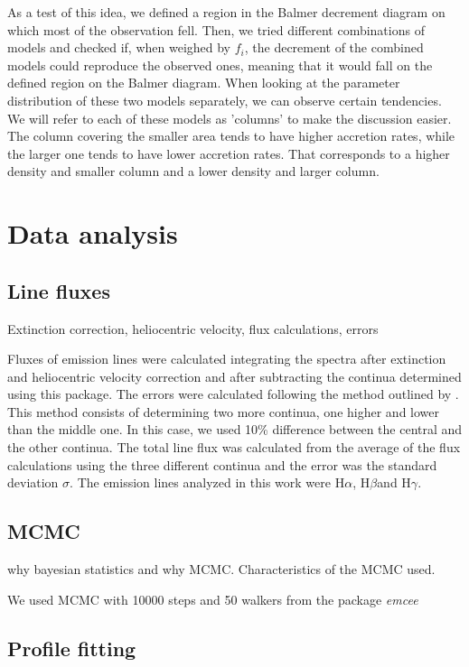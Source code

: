 \documentclass[twocolumn,linenumbers]{aastex631}
\newcommand{\halpha}{H$\alpha$}
\newcommand{\hbeta}{H$\beta$}
\newcommand{\hgamma}{H$\gamma$}
\begin{document}
As a test of this idea, we defined a region in the Balmer decrement diagram on which most of the observation fell. Then, we tried different combinations of models and checked if, when weighed by $f_i$, the decrement of the combined models could reproduce the observed ones, meaning that it would fall on the defined region on the Balmer diagram. When looking at the parameter distribution of these two models separately, we can observe certain tendencies. We will refer to each of these models as 'columns' to make the discussion easier. The column covering the smaller area tends to have higher accretion rates, while the larger one tends to have lower accretion rates. That corresponds to a higher density and smaller column and a lower density and larger column.

\section{Data analysis}

\subsection{Line fluxes}

Extinction correction, heliocentric velocity, flux calculations, errors

Fluxes of emission lines were calculated integrating the spectra after extinction and heliocentric velocity correction and after subtracting the continua determined using this package. The errors were calculated following the method outlined by \citet{alcala2014}. This method consists of determining two more continua, one higher and lower than the middle one. In this case, we used 10\% difference between the central and the other continua. The total line flux was calculated from the average of the flux calculations using the three different continua and the error was the standard deviation $\sigma$. The emission lines analyzed in this work were \halpha, \hbeta and \hgamma.


\subsection{MCMC}

why bayesian statistics and why MCMC. Characteristics of the MCMC used. 

We used MCMC with 10000 steps and 50 walkers from the package \textit{emcee}

\subsection{Profile fitting}
\end{document}
